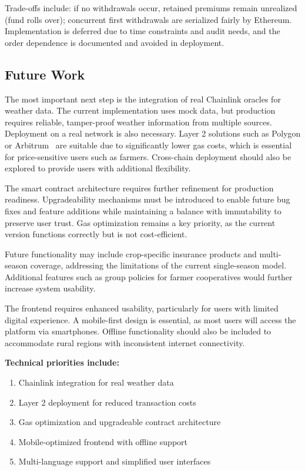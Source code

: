 \documentclass[11pt,a4paper]{article}
\begin{document}
        Trade-offs include: if no withdrawals occur, retained premiums remain unrealized (fund rolls over); concurrent first withdrawals are serialized fairly by Ethereum.
        Implementation is deferred due to time constraints and audit needs, and the order dependence is documented and avoided in deployment.


		\subsection{Future Work}\label{subsec:future-work}
		The most important next step is the integration of real Chainlink oracles for weather data.
		The current implementation uses mock data, but production requires reliable, tamper-proof weather information from multiple sources.
		Deployment on a real network is also necessary.
		Layer 2\footnotemark{} solutions such as Polygon or Arbitrum~\footnotemark{} are suitable due to significantly lower gas costs, which is essential for price-sensitive users such as farmers.
		Cross-chain deployment should also be explored to provide users with additional flexibility.

		The smart contract architecture requires further refinement for production readiness.
		Upgradeability mechanisms must be introduced to enable future bug fixes and feature additions while maintaining a balance with immutability to preserve user trust.
		Gas optimization remains a key priority, as the current version functions correctly but is not cost-efficient.

		Future functionality may include crop-specific insurance products and multi-season coverage, addressing the limitations of the current single-season model.
		Additional features such as group policies for farmer cooperatives would further increase system usability.

		The frontend requires enhanced usability, particularly for users with limited digital experience.
		A mobile-first design is essential, as most users will access the platform via smartphones.
		Offline functionality should also be included to accommodate rural regions with inconsistent internet connectivity.

		\textbf{Technical priorities include:}

		\begin{enumerate}
			\item Chainlink integration for real weather data
			\item Layer 2 deployment for reduced transaction costs
			\item Gas optimization and upgradeable contract architecture
			\item Mobile-optimized frontend with offline support
			\item Multi-language support and simplified user interfaces
		\end{enumerate}
\end{document}
